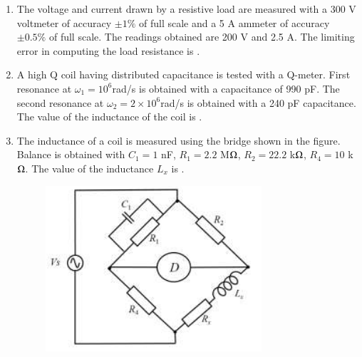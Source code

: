 \documentclass[journal,12pt,onecolumn]{IEEEtran}
\theoremstyle{remark}
\begin{document}
\begin{enumerate}
    \item The voltage and current drawn by a resistive load are measured with a 300 V voltmeter of accuracy $\pm 1\%$ of full scale and a 5 A ammeter of accuracy $\pm 0.5\%$ of full scale. The readings obtained are 200 V and 2.5 A. The limiting error  in computing the load resistance is  \underline{\hspace{2cm}}.
    
    \hfill{}

    \item A high Q coil having distributed  capacitance is tested with a Q-meter. First resonance at $\omega_1 = 10^6$rad/s is obtained with a capacitance of 990 pF. The second resonance at $\omega_2 = 2 \times 10^6$rad/s is obtained with a 240 pF capacitance. The value of the inductance  of the coil is  \underline{\hspace{2cm}}.
    
    \hfill{}

    \item The inductance of a coil is measured using the bridge shown in the figure. Balance  is obtained with $C_1 = 1$ nF, $R_1 = 2.2$ M$\ohm$, $R_2 = 22.2$ k$\ohm$, $R_4 = 10$ k$\ohm$. The value of the inductance $L_x$  is \underline{\hspace{2cm}}.
    \begin{figure}[H]
        \centering
        \includegraphics[width=0.5\columnwidth]{q49.png}
        \caption*{}
        \label{fig:q49}
    \end{figure}
    
    \hfill{}


\end{enumerate}
\end{document}
